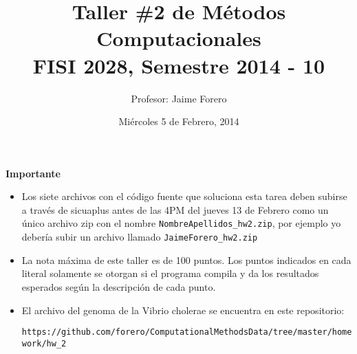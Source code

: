\documentclass{article}
\title{Taller \#2 de M\'etodos Computacionales\\ FISI 2028, Semestre 2014 - 10}
\author{Profesor: Jaime Forero}
\date{Mi\'ercoles 5 de Febrero, 2014}
\begin{document}
\maketitle
\thispagestyle{empty}


{\bf Importante}
\begin{itemize}

\item Los siete archivos con el c\'odigo fuente que soluciona esta
  tarea deben subirse a trav\'es de sicuaplus antes de las 4PM del
  jueves 13 de Febrero como un \'unico archivo zip con el nombre
  \verb"NombreApellidos_hw2.zip", por ejemplo yo deber\'ia subir un
  archivo llamado \verb"JaimeForero_hw2.zip"

\item La nota m\'axima de este taller es de 100 puntos. Los puntos indicados
en cada literal solamente se otorgan si el programa compila y da los
resultados esperados seg\'un la descripci\'on de cada punto.
 

\item El archivo del genoma de la Vibrio cholerae se encuentra en este
  repositorio:

  \verb"https://github.com/forero/ComputationalMethodsData/tree/master/homework/hw_2"
\end{itemize}
\end{document}
